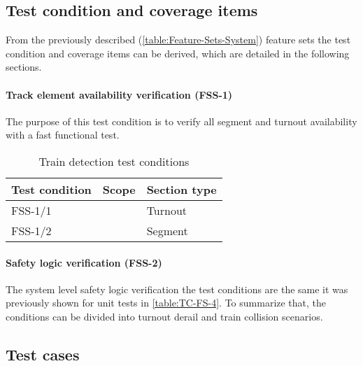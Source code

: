\subsection{Test condition and coverage items}
From the previously described (\ref{table:Feature-Sets-System}) feature sets the test condition and coverage items can be derived, which are detailed in the following sections.
\paragraph{Track element availability verification (FSS-1)} The purpose of this test condition is to verify all segment and turnout availability with a fast functional test. 
\begin{table}[H]
	\caption{Train detection test conditions}
	\label{table:TC-FSS-1}
	\begin{center}
		\renewcommand{\arraystretch}{1.8}
		\begin{tabu} 
			to 0.9 \textwidth
			{  X[c] X[c] X[c] }
			\toprule
			Test condition & Scope                      & Section type \\ \midrule
			FSS-1/1        &  & Turnout      \\
			FSS-1/2        &                            & Segment      \\ \bottomrule
		\end{tabu}
	\end{center}
\end{table} 
\paragraph{Safety logic verification (FSS-2)} The system level safety logic verification the test conditions are the same it was previously shown for unit tests in \autoref{table:TC-FS-4}. To summarize that, the conditions can be divided into turnout derail and train collision scenarios. 

\subsection{Test cases}
